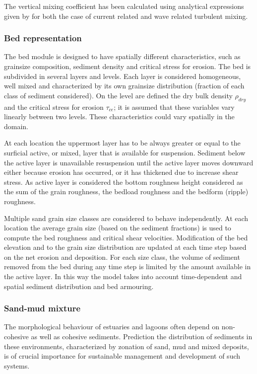 The vertical mixing coefficient has been calculated  using analytical
expressions given by \cite{vanrijn93:prin} for both the case of current
related and wave related turbulent mixing.

\subsubsection{Bed representation}
The bed module is designed to have spatially different characteristics, such 
as grainsize composition, sediment density and critical stress for erosion.
The bed is subdivided in several layers and levels. Each layer is considered
homogeneous, well mixed and characterized by its own grainsize distribution
(fraction of each class of sediment considered). On the level are defined
the dry bulk density $\rho_{dry}$ and the critical stress for erosion
$\tau_{ce}$; it is assumed that these variables vary linearly between two
levels. These characteristics could vary spatially in the domain.

At each location the uppermost layer has to be always greater or equal to
the surficial active, or mixed, layer that is available for suspension.
Sediment below the active layer is unavailable resuspension until the 
active layer moves downward either because erosion has occurred, or it 
has thickened due to increase shear stress. As active layer is considered 
the bottom roughness height considered as the sum of the grain roughness, 
the bedload roughness and the bedform (ripple) roughness.

Multiple sand grain size classes are considered to behave independently. At
each location the average grain size (based on the sediment fractions) is
used to compute the bed roughness and critical shear velocities.
Modification of the bed elevation and to the grain size distribution are
updated at each time step based on the net erosion and deposition.
For each size class, the volume of sediment removed from the bed during any
time step is limited by the amount available in the active layer. In this
way the model takes into account time-dependent and spatial sediment
distribution and bed armouring.

\subsubsection{Sand-mud mixture}
The morphological behaviour of estuaries and lagoons often depend on
non-cohesive as well as cohesive sediments. Prediction the distribution
of sediments in these environments, characterized by zonation of sand,
mud and mixed deposits, is of crucial importance for sustainable
management and development of such systems.

